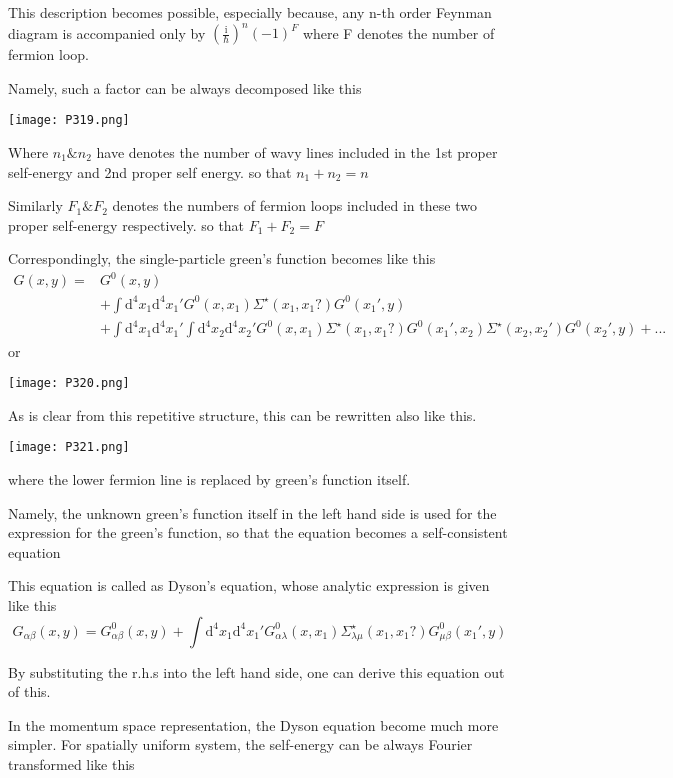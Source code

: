 This description becomes possible, especially  because, any n-th order Feynman diagram is accompanied only by $(\frac{\mathrm{i}}{\hbar})^n(-1)^F$ where F denotes the number of fermion loop.

Namely, such a factor can be always decomposed like this
\begin{center}
\texttt{[image: P319.png]}
\end{center}
Where $n_1\&n_2$ have denotes the number of wavy lines included in the 1st proper self-energy and 2nd proper self energy. so that $n_1+n_2=n$

Similarly $F_1\&F_2$ denotes the numbers of fermion loops included in these two proper self-energy respectively. so that $F_1+F_2=F$

Correspondingly, the single-particle green's function becomes like this
\begin{align}
G(x,y)=&G^0(x,y) \nonumber \\
&+\int \mathrm{d}^4x_1\mathrm{d}^4x_1'G^0(x,x_1)\Sigma^{\star}(x_1,x_1?)G^0(x_1',y) \nonumber \\
&+\int \mathrm{d}^4x_1\mathrm{d}^4x_1'\int \mathrm{d}^4x_2\mathrm{d}^4x_2'G^0(x,x_1)\Sigma^{\star}(x_1,x_1?)G^0(x_1',x_2)\Sigma^{\star}(x_2,x_2')G^0(x_2',y)+... \nonumber
\end{align}
or
\begin{center}
\texttt{[image: P320.png]}
\end{center}
As is clear from this repetitive structure, this can be rewritten also like this.
\begin{center}
\texttt{[image: P321.png]}
\end{center}
where the lower fermion line is replaced by green's function itself.

Namely, the unknown green's function itself in the left hand side is used for the expression for the green's function, so that the equation becomes a self-consistent equation

This equation is called as Dyson's equation, whose analytic expression is given like this
$$G_{\alpha\beta}(x,y)=G_{\alpha\beta}^0(x,y)+\int \mathrm{d}^4x_1\mathrm{d}^4x_1'G^0_{\alpha\lambda}(x,x_1)\Sigma_{\lambda\mu}^{\star}(x_1,x_1?)G_{\mu\beta}^0(x_1',y)$$
 
By substituting the r.h.s into the left hand side, one can derive this equation out of this.


In the momentum space representation, the Dyson equation become much more simpler. For spatially uniform system, the self-energy can be always Fourier transformed like this

